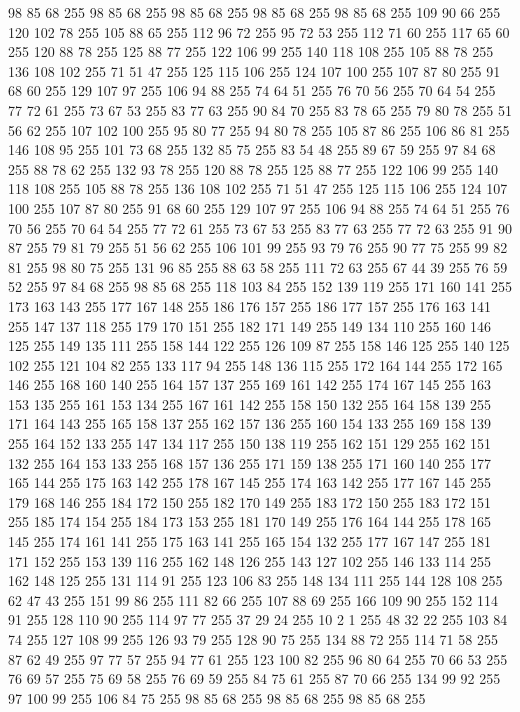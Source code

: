98 85 68 255 98 85 68 255 98 85 68 255 98 85 68 255 98 85 68 255 109 90 66 255 120 102 78 255 105 88 65 255 112 96 72 255 95 72 53 255 112 71 60 255 117 65 60 255 120 88 78 255 125 88 77 255 122 106 99 255 140 118 108 255 105 88 78 255 136 108 102 255 71 51 47 255 125 115 106 255 124 107 100 255 107 87 80 255 91 68 60 255 129 107 97 255 106 94 88 255 74 64 51 255 76 70 56 255 70 64 54 255 77 72 61 255 73 67 53 255 83 77 63 255 90 84 70 255 83 78 65 255 79 80 78 255 51 56 62 255 107 102 100 255 95 80 77 255 94 80 78 255 105 87 86 255 106 86 81 255 146 108 95 255 101 73 68 255 132 85 75 255 83 54 48 255 89 67 59 255 97 84 68 255 88 78 62 255 132 93 78 255 120 88 78 255 125 88 77 255 122 106 99 255 140 118 108 255 105 88 78 255 136 108 102 255 71 51 47 255 125 115 106 255 124 107 100 255 107 87 80 255 91 68 60 255 129 107 97 255 106 94 88 255 74 64 51 255 76 70 56 255 70 64 54 255
77 72 61 255 73 67 53 255 83 77 63 255 77 72 63 255 91 90 87 255 79 81 79 255 51 56 62 255 106 101 99 255 93 79 76 255 90 77 75 255 99 82 81 255 98 80 75 255 131 96 85 255 88 63 58 255 111 72 63 255 67 44 39 255 76 59 52 255 97 84 68 255 98 85 68 255 118 103 84 255 152 139 119 255 171 160 141 255 173 163 143 255 177 167 148 255 186 176 157 255 186 177 157 255 176 163 141 255 147 137 118 255 179 170 151 255 182 171 149 255 149 134 110 255 160 146 125 255 149 135 111 255 158 144 122 255 126 109 87 255 158 146 125 255 140 125 102 255 121 104 82 255 133 117 94 255 148 136 115 255 172 164 144 255 172 165 146 255 168 160 140 255 164 157 137 255 169 161 142 255 174 167 145 255 163 153 135 255 161 153 134 255 167 161 142 255 158 150 132 255 164 158 139 255 171 164 143 255 165 158 137 255 162 157 136 255 160 154 133 255 169 158 139 255 164 152 133 255 147 134 117 255 150 138 119 255 162 151 129 255 162 151 132 255 164 153 133 255 168 157 136 255 171 159 138 255
171 160 140 255 177 165 144 255 175 163 142 255 178 167 145 255 174 163 142 255 177 167 145 255 179 168 146 255 184 172 150 255 182 170 149 255 183 172 150 255 183 172 151 255 185 174 154 255 184 173 153 255 181 170 149 255 176 164 144 255 178 165 145 255 174 161 141 255 175 163 141 255 165 154 132 255 177 167 147 255 181 171 152 255 153 139 116 255 162 148 126 255 143 127 102 255 146 133 114 255 162 148 125 255 131 114 91 255 123 106 83 255 148 134 111 255 144 128 108 255 62 47 43 255 151 99 86 255 111 82 66 255 107 88 69 255 166 109 90 255 152 114 91 255 128 110 90 255 114 97 77 255 37 29 24 255 10 2 1 255 48 32 22 255 103 84 74 255 127 108 99 255 126 93 79 255 128 90 75 255 134 88 72 255 114 71 58 255 87 62 49 255 97 77 57 255 94 77 61 255 123 100 82 255 96 80 64 255 70 66 53 255 76 69 57 255 75 69 58 255 76 69 59 255 84 75 61 255 87 70 66 255 134 99 92 255 97 100 99 255 106 84 75 255 98 85 68 255 98 85 68 255 98 85 68 255
